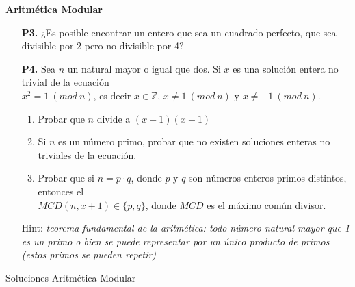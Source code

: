 \documentclass[letterpaper,11pt]{article}
\newcommand{\Z}{\mathbb Z}
\theoremstyle{plain}
\begin{document}
\begin{center}
    \LARGE \bf Aritmética Modular
\end{center}
\begin{enumerate}
\item[\bf P3.] ¿Es posible encontrar un entero que sea un cuadrado perfecto, que sea divisible por 2 pero no divisible por 4?
\item[\bf P4.] 
    Sea $n$ un natural mayor o igual que dos. Si $x$ es una solución entera no trivial de la ecuación \\$x^2=1 ~ (mod~ n)$, es decir $x\in \Z$, $x\neq 1 ~(mod~ n)$ y $x\neq -1~ (mod~ n)$.
    \begin{enumerate}
        \item Probar que $n$ divide a $(x-1)(x+1)$
        \item Si $n$ es un número primo, probar que no existen soluciones enteras no triviales de la ecuación.
        \item Probar que si $n=p\cdot q$, donde $p$ y $q$ son números enteros primos distintos, entonces el\\ $MCD(n,x+1) \in \{p,q\}$, donde $MCD$ es el máximo común divisor.
    \end{enumerate}
    
    Hint: \textit{teorema fundamental de la aritmética: todo número natural mayor que 1 es un primo o bien se puede representar por un único producto de primos (estos primos se pueden repetir)}
\end{enumerate}


\newpage 

\begin{center}
    Soluciones Aritmética Modular
\end{center}
\end{document}
